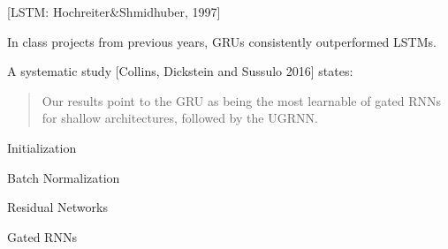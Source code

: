{\centerline{\Large [LSTM: Hochreiter\&Shmidhuber, 1997]}


\vfill
In class projects from previous years, GRUs consistently outperformed LSTMs.

\vfill
A systematic study [Collins, Dickstein and Sussulo 2016] states:

\begin{quotation}
  Our results point to the GRU as being the most learnable of gated RNNs for shallow architectures, followed by the UGRNN.
\end{quotation}

\vfill
  \centerline{Initialization}
  \vfill
  \centerline{Batch Normalization}
  \vfill
  \centerline{Residual Networks}
  \vfill
  \centerline{Gated RNNs}


}

